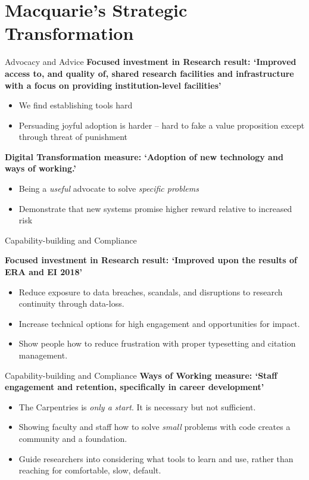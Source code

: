 \documentclass[aspectratio=169, 11pt]{beamer} %
\begin{document}
\section{Macquarie's Strategic Transformation}

\begin{frame}{Advocacy and Advice}
\textbf{Focused investment in Research result: `Improved access to, and quality of, shared research facilities and infrastructure with a focus on providing institution-level facilities'}

\begin{itemize}
    \item We find establishing tools hard
    \item Persuading joyful adoption is harder -- hard to fake a value proposition except through threat of punishment
\end{itemize}

\textbf{Digital Transformation measure: `Adoption of new technology and ways of working.'}
\begin{itemize}
    \item Being a \textit{useful} advocate to solve \textit{specific problems}
    \item Demonstrate that new systems promise higher reward relative to increased risk
\end{itemize}
\end{frame}

\begin{frame}{Capability-building and Compliance}

\textbf{Focused investment in Research result: `Improved upon the results of ERA and EI 2018'}

\begin{itemize}
    \item Reduce exposure to data breaches,  scandals, and disruptions to research continuity through data-loss.
    \item Increase technical options for high engagement and opportunities for impact.
    \item Show people how to reduce frustration with proper typesetting and citation management.
\end{itemize}
\end{frame}

\begin{frame}{Capability-building and Compliance}
\textbf{Ways of Working measure: `Staff engagement and retention, specifically in career development'}
\begin{itemize}
    \item The Carpentries is \textit{only a start}. It is necessary but not sufficient.
    \item Showing faculty and staff how to solve \textit{small} problems with code creates a community and a foundation.
    \item Guide researchers into considering what tools to learn and use, rather than reaching for comfortable, slow, default.
\end{itemize}
\end{frame}
\end{document}
